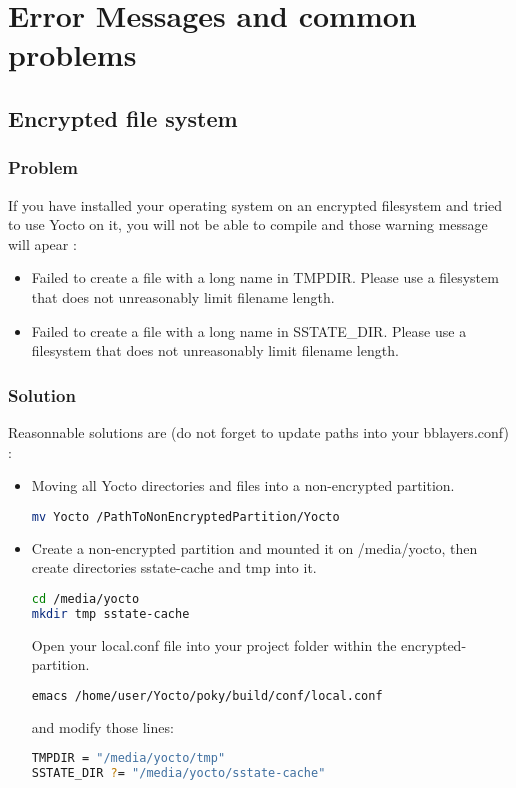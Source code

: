 \chapter{Error Messages and common problems}
\label{chap:error}
\section{Encrypted file system}
\subsection{Problem}
If you have installed your operating system on an encrypted filesystem and tried to use Yocto on it, you will not be able to compile and those warning message will apear :
\begin{itemize}
	\item Failed to create a file with a long name in TMPDIR. Please use a filesystem that does not unreasonably limit filename length.
	\item Failed to create a file with a long name in SSTATE\_DIR. Please use a filesystem that does not unreasonably limit filename length.
\end{itemize}
\subsection{Solution}
Reasonnable solutions are (do not forget to update paths into your bblayers.conf) :
\begin{itemize}
\item Moving all Yocto directories and files into a non-encrypted partition.
\begin{lstlisting}[language=bash]
mv Yocto /PathToNonEncryptedPartition/Yocto
\end{lstlisting}
\item Create a non-encrypted partition and mounted it on /media/yocto, then create directories sstate-cache and tmp into it. 
\begin{lstlisting}[language=bash]
cd /media/yocto
mkdir tmp sstate-cache 
\end{lstlisting}
Open your local.conf file into your project folder within the encrypted-partition.
\begin{lstlisting}[language=bash]
emacs /home/user/Yocto/poky/build/conf/local.conf
\end{lstlisting}
and modify those lines: 
\begin{lstlisting}[language=bash]
TMPDIR = "/media/yocto/tmp"
SSTATE_DIR ?= "/media/yocto/sstate-cache"
\end{lstlisting}

\end{itemize}
